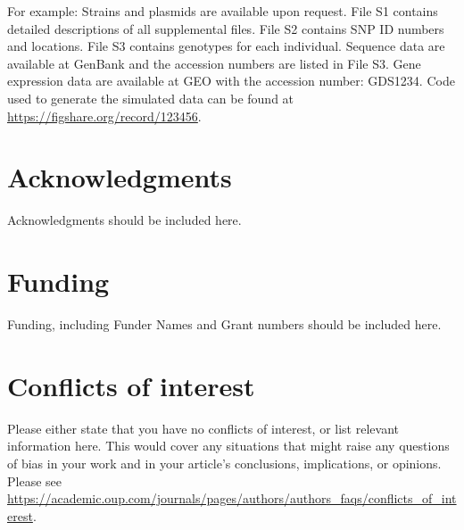 \documentclass[9pt,twocolumn,twoside,lineno]{gsajnl}
\begin{document}
For example: Strains and plasmids are available upon request. File S1 contains detailed descriptions of all supplemental files. File S2 contains SNP ID numbers and locations. File S3 contains genotypes for each individual. Sequence data are available at GenBank and the accession numbers are listed in File S3. Gene expression data are available at GEO with the accession number: GDS1234. Code used to generate the simulated data can be found at \url{https://figshare.org/record/123456}.

\section{Acknowledgments}
Acknowledgments should be included here.

\section{Funding}
Funding, including Funder Names and Grant numbers should be included here.

\section{Conflicts of interest}
Please either state that you have no conflicts of interest, or list relevant information here.  This would cover any situations that might raise any questions of bias in your work and in your article’s conclusions, implications, or opinions. Please see \url{https://academic.oup.com/journals/pages/authors/authors_faqs/conflicts_of_interest}.


\end{document}
